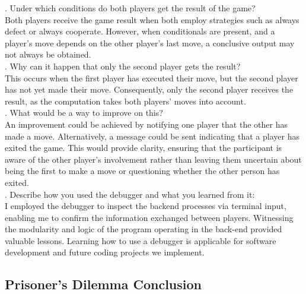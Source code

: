\documentclass{article}
\theoremstyle{theorem}
\theoremstyle{definition}
\theoremstyle{remark}
\begin{document}
. Under which conditions do both players get the result of the game? \\

Both players receive the game result when both employ strategies such as always defect or always cooperate. However, when conditionals are present, and a player's move depends on the other player's last move, a conclusive output may not always be obtained.\\

. Why can it happen that only the second player gets the result?\\

This occurs when the first player has executed their move, but the second player has not yet made their move. Consequently, only the second player receives the result, as the computation takes both players' moves into account.\\

. What would be a way to improve on this?\\

An improvement could be achieved by notifying one player that the other has made a move. Alternatively, a message could be sent indicating that a player has exited the game. This would provide clarity, ensuring that the participant is aware of the other player's involvement rather than leaving them uncertain about being the first to make a move or questioning whether the other person has exited.\\

. Describe how you used the debugger and what you learned from it:\\

I employed the debugger to inspect the backend processes via terminal input, enabling me to confirm the information exchanged between players. Witnessing the modularity and logic of the program operating in the back-end provided valuable lessons. Learning how to use a debugger is applicable for software development and future coding projects we implement. 

\subsection{Prisoner's Dilemma Conclusion}
\end{document}
